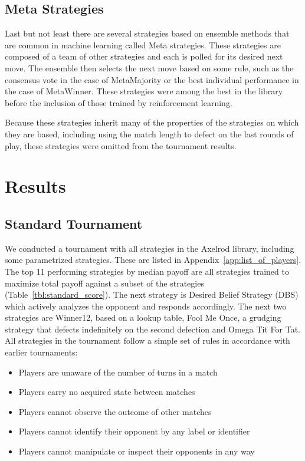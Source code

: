 \documentclass{article}
\begin{document}
\subsection{Meta Strategies}

Last but not least there are several strategies based on ensemble methods that
are common in machine learning called Meta strategies. These strategies are
composed of a team of other strategies and each is polled for its desired next
move. The ensemble then selects the next move based on some rule, such as the
consensus vote in the case of MetaMajority or the best individual performance
in the case of MetaWinner. These strategies were among the best in the library
before the inclusion of those trained by reinforcement learning.

Because these strategies inherit many of the properties of the strategies
on which they are based, including using the match length to defect on the last
rounds of play, these strategies were omitted from the tournament results.

\section{Results}

\subsection{Standard Tournament}

We conducted a tournament with all strategies in the Axelrod library, including
some parametrized strategies. These are listed in
Appendix~\ref{app:list_of_players}.
The top
11 performing strategies by median payoff are all strategies trained to maximize
total payoff against a subset of the strategies (Table~\ref{tbl:standard_score}).
The next strategy is
Desired Belief Strategy (DBS)
which actively analyzes the opponent and responds
accordingly. The next two strategies are Winner12, based on a lookup table,
Fool Me Once, a grudging strategy that defects indefinitely on
the second defection and Omega Tit For Tat.
All strategies in the tournament follow a simple set of
rules in accordance with earlier tournaments:

\begin{itemize}
  \item Players are unaware of the number of turns in a match
  \item Players carry no acquired state between matches
  \item Players cannot observe the outcome of other matches
  \item Players cannot identify their opponent by any label or identifier
  \item Players cannot manipulate or inspect their opponents in any way
\end{itemize}
\end{document}
